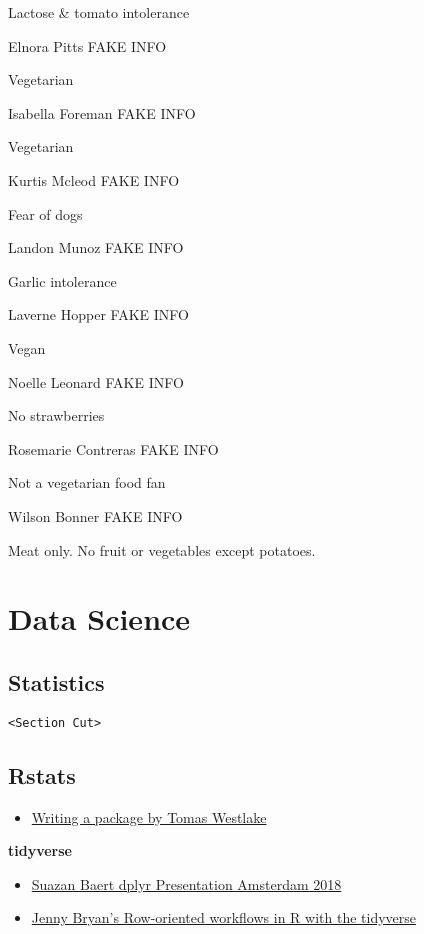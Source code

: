 \documentclass[]{book}
\providecommand{\tightlist}{%
  \setlength{\itemsep}{0pt}\setlength{\parskip}{0pt}}
\theoremstyle{definition}
\theoremstyle{definition}
\theoremstyle{definition}
\theoremstyle{remark}
\begin{document}
Lactose \& tomato intolerance

Elnora Pitts FAKE INFO

Vegetarian

Isabella Foreman FAKE INFO

Vegetarian

Kurtis Mcleod FAKE INFO

Fear of dogs

Landon Munoz FAKE INFO

Garlic intolerance

Laverne Hopper FAKE INFO

Vegan

Noelle Leonard FAKE INFO

No strawberries

Rosemarie Contreras FAKE INFO

Not a vegetarian food fan

Wilson Bonner FAKE INFO

Meat only. No fruit or vegetables except potatoes.

\chapter{Data Science}\label{data-science}

\section{Statistics}\label{statistics}

\texttt{\textless{}Section\ Cut\textgreater{}}

\section{Rstats}\label{rstats}

\begin{itemize}
\tightlist
\item
  \href{https://r-mageddon.netlify.com/post/writing-an-r-package-from-scratch/}{Writing
  a package by Tomas Westlake}
\end{itemize}

\textbf{tidyverse}

\begin{itemize}
\tightlist
\item
  \href{https://github.com/suzanbaert/SatRdaysAmsterdam18_dplyr}{Suazan
  Baert dplyr Presentation Amsterdam 2018}
\item
  \href{https://github.com/jennybc/row-oriented-workflows}{Jenny Bryan's
  Row-oriented workflows in R with the tidyverse}
\end{itemize}
\end{document}

